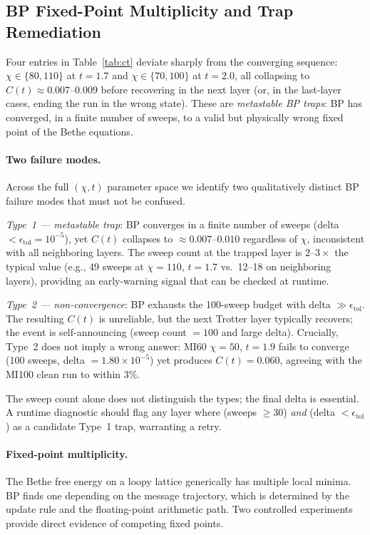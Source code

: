 \documentclass[11pt]{article}
\newcommand{\Ct}{C(t)}
\begin{document}
\subsection{BP Fixed-Point Multiplicity and Trap Remediation}
\label{sec:bp_convergence}

Four entries in Table~\ref{tab:ct} deviate sharply from the converging sequence:
$\chi \in \{80, 110\}$ at $t=1.7$ and $\chi \in \{70, 100\}$ at $t=2.0$,
all collapsing to $\Ct \approx 0.007$--$0.009$ before recovering in the next
layer (or, in the last-layer cases, ending the run in the wrong state).
These are \emph{metastable BP traps}: BP has converged, in a finite number of
sweeps, to a valid but physically wrong fixed point of the Bethe equations.

\paragraph{Two failure modes.}
Across the full $(\chi, t)$ parameter space we identify two qualitatively
distinct BP failure modes that must not be confused.

\emph{Type~1 --- metastable trap}: BP converges in a finite number of sweeps
(delta $< \epsilon_{\mathrm{tol}} = 10^{-5}$), yet $\Ct$ collapses to
$\approx 0.007$--$0.010$ regardless of $\chi$, inconsistent with all
neighboring layers.
The sweep count at the trapped layer is $2$--$3\times$ the typical value
(e.g., 49 sweeps at $\chi=110$, $t=1.7$ vs.\ 12--18 on neighboring layers),
providing an early-warning signal that can be checked at runtime.

\emph{Type~2 --- non-convergence}: BP exhausts the 100-sweep budget with
delta $\gg \epsilon_{\mathrm{tol}}$.
The resulting $\Ct$ is unreliable, but the next Trotter layer typically
recovers; the event is self-announcing (sweep count $= 100$ and large delta).
Crucially, Type~2 does not imply a wrong answer: MI60 $\chi=50$, $t=1.9$
fails to converge (100 sweeps, delta $= 1.80\times10^{-5}$) yet produces
$\Ct = 0.060$, agreeing with the MI100 clean run to within 3\%.

The sweep count alone does not distinguish the types; the final delta is
essential. A runtime diagnostic should flag any layer where
(sweeps $\geq 30$) \emph{and} (delta $< \epsilon_{\mathrm{tol}}$) as a
candidate Type~1 trap, warranting a retry.

\paragraph{Fixed-point multiplicity.}
The Bethe free energy on a loopy lattice generically has multiple local minima.
BP finds one depending on the message trajectory, which is determined by the
update rule and the floating-point arithmetic path.
Two controlled experiments provide direct evidence of competing fixed points.
\end{document}
